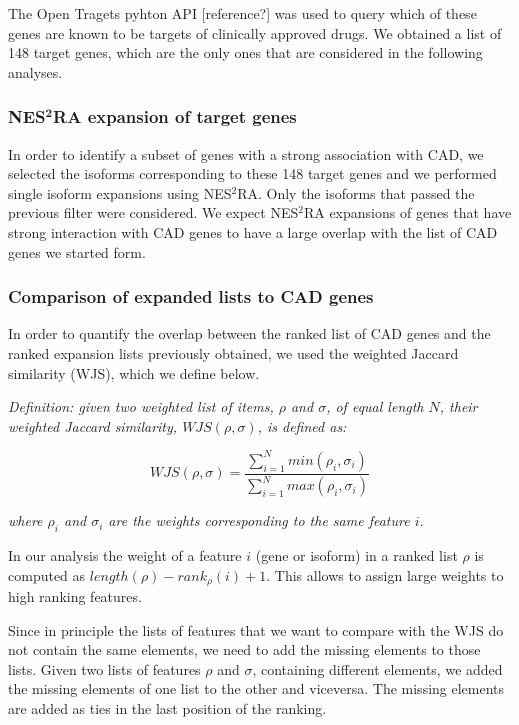 \documentclass[fleqn,10pt]{SelfArx} %
\begin{document}
The Open Tragets pyhton API [reference?] was used to query which of these genes are known to be targets of clinically approved drugs. We obtained a list of 148 target genes, which are the only ones that are considered in the following analyses.

\subsubsection{NES$^{\textbf{2}}$RA expansion of target genes}

In order to identify a subset of genes with a strong association with CAD, we selected the isoforms corresponding to these 148 target genes and we performed single isoform expansions using NES$^2$RA. Only the isoforms that passed the previous filter were considered. We expect NES$^2$RA expansions of genes that have strong interaction with CAD genes to have a large overlap with the list of CAD genes we started form.

\subsubsection{Comparison of expanded lists to CAD genes}

In order to quantify the overlap between the ranked list of CAD genes and the ranked expansion lists previously obtained, we used the weighted Jaccard similarity (WJS), which we define below.\medskip

\noindent
\textit{Definition: given two weighted list of items, $\rho$ and $\sigma$, of equal length $N$, their weighted Jaccard similarity, $WJS(\rho, \sigma)$, is defined as:}

$$
WJS(\rho, \sigma) = \dfrac{\sum_{i=1}^Nmin(\rho_i,\sigma_i)}{\sum_{i=1}^Nmax(\rho_i,\sigma_i)}
$$

\noindent
\textit{where $\rho_i$ and $\sigma_i$ are the weights corresponding to the same feature $i$.}\medskip

In our analysis the weight of a feature $i$ (gene or isoform) in a ranked list $\rho$ is computed as $length(\rho) - rank_{\rho}(i) + 1$. This allows to assign large weights to high ranking features.

Since in principle the lists of features that we want to compare with the WJS do not contain the same elements, we need to add the missing elements to those lists. Given two lists of features $\rho$ and $\sigma$, containing different elements, we added the missing elements of one list to the other and viceversa. The missing elements are added as ties in the last position of the ranking.
\end{document}
